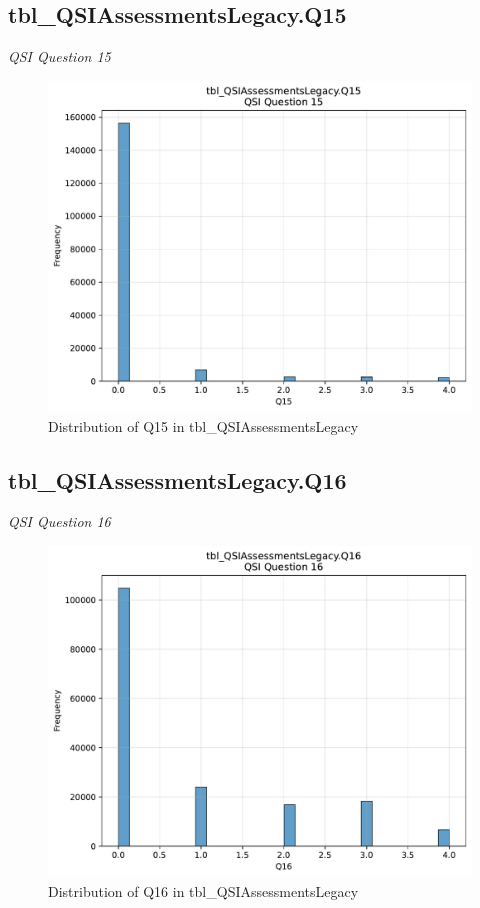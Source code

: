 \subsection{tbl\_QSIAssessmentsLegacy.Q15}
\textit{QSI Question 15}

\begin{figure}[htbp]
\centering
\includegraphics[width=\textwidth]{figures/dbo_tbl_QSIAssessmentsLegacy_Q15.pdf}
\caption{Distribution of Q15 in tbl\_QSIAssessmentsLegacy}
\end{figure}\newpage

\subsection{tbl\_QSIAssessmentsLegacy.Q16}
\textit{QSI Question 16}

\begin{figure}[htbp]
\centering
\includegraphics[width=\textwidth]{figures/dbo_tbl_QSIAssessmentsLegacy_Q16.pdf}
\caption{Distribution of Q16 in tbl\_QSIAssessmentsLegacy}
\end{figure}\newpage

